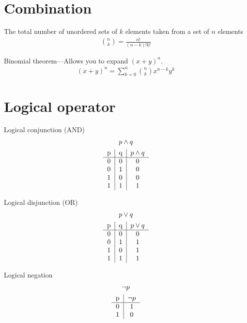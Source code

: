 \documentclass{article}
\begin{document}
\section{Combination}
The total number of unordered sets of $k$ elements taken from a set of $n$ elements
\begin{gather*}
    \binom{n}{k} = \frac{n!}{(n-k)!k!}
\end{gather*}

Binomial theorem---Allows you to expand $(x+y)^n$.
\begin{gather*}
    (x + y)^n = \sum_{k=0}^{n} \binom{n}{k}x^{n-k}y^k
\end{gather*}

\section{Logical operator}

Logical conjunction (AND)
\begin{gather*}
    p \land q \\
    \begin{tabular}{c|c|c}
        p & q & $p \land q$ \\
        \hline
        0 & 0 & 0 \\
        0 & 1 & 0 \\
        1 & 0 & 0 \\
        1 & 1 & 1
    \end{tabular}
\end{gather*}

Logical disjunction (OR)
\begin{gather*}
    p \lor q \\
    \begin{tabular}{c|c|c}
        p & q & $p \lor q$ \\
        \hline
        0 & 0 & 0 \\
        0 & 1 & 1 \\
        1 & 0 & 1 \\
        1 & 1 & 1
    \end{tabular}
\end{gather*}

Logical negation
\begin{gather*}
    \neg p \\
    \begin{tabular}{c|c}
        p & $\neg p$ \\
        \hline
        0 & 1 \\
        1 & 0
    \end{tabular}
\end{gather*}
\end{document}
